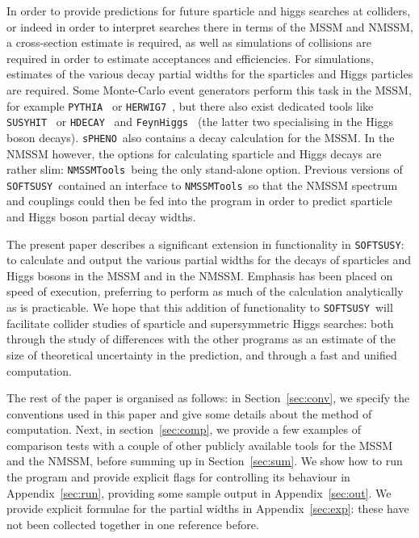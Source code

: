 \documentclass[final,3p,times,pdflatex]{elsarticle}
\def\code#1{{\tt #1}}
\begin{document}
In order to provide predictions for future sparticle and higgs searches at
colliders, or indeed in order to interpret searches there in terms 
of the MSSM and NMSSM, a cross-section estimate is required, as well as 
simulations of collisions are required in order to
estimate acceptances and efficiencies. For simulations, estimates of the
various decay partial widths for the sparticles and Higgs
particles are required. Some Monte-Carlo event generators perform this task in
the MSSM, for example \code{PYTHIA}~\cite{Sjostrand:2014zea} or
\code{HERWIG7}~\cite{Bahr:2008pv}, but 
there also exist dedicated tools like
\code{SUSYHIT}~\cite{Djouadi:2006bz} or \code{HDECAY}~\cite{Djouadi:1997yw} and
\code{FeynHiggs}~\cite{Heinemeyer:1998yj} (the latter two
specialising in the 
Higgs boson decays). \code{sPHENO}~also contains a decay
calculation for the MSSM. In the NMSSM however, the options for calculating
sparticle and 
Higgs decays are rather slim: \code{NMSSMTools}~being the only stand-alone
option. Previous versions of \code{SOFTSUSY}~contained an interface to
\code{NMSSMTools}~so that the NMSSM spectrum and couplings could then be fed
into the program in order to predict sparticle and Higgs boson partial decay
widths. 

The present paper describes a significant extension in functionality in
\code{SOFTSUSY}: to calculate and output the various partial widths for the
decays of sparticles and Higgs bosons in the MSSM and in the NMSSM. 
Emphasis has been placed on speed of execution, preferring to perform as much
of the calculation analytically as is practicable. 
We hope
that this addition of functionality to \code{SOFTSUSY}~will facilitate
collider studies of sparticle and supersymmetric 
Higgs searches: both through the study of differences with the other programs
as an estimate of the size of theoretical uncertainty in the prediction, and 
through a fast and unified computation. 

The rest of the paper is organised as follows: in Section~\ref{sec:conv}, we 
specify the conventions used in this paper and give some details about the
method of computation. Next, in section~\ref{sec:comp}, we provide a few
examples of comparison tests 
with a couple of other publicly available tools for the MSSM and the NMSSM,
before summing up in Section~\ref{sec:sum}. We show how to run the program and
provide explicit flags for controlling its behaviour in
Appendix~\ref{sec:run}, providing some sample output in
Appendix~\ref{sec:out}. 
We provide explicit formulae for
the partial widths in Appendix~\ref{sec:exp}: these have not been collected
together in one reference before. 
\end{document}
